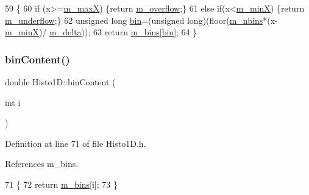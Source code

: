 \begin{DoxyCode}
59                            \{
60     \textcolor{keywordflow}{if} (x>=\hyperlink{classHisto1D_a6a5007569e096537f9b7b39d2aad865b}{m\_maxX}) \{\textcolor{keywordflow}{return} \hyperlink{classHisto1D_ab60b2ec4e435a3094b7ec218404aa16f}{m\_overflow};\}
61     \textcolor{keywordflow}{else} \textcolor{keywordflow}{if}(x<\hyperlink{classHisto1D_af5ce58b20e96fa6e4b306109dd88589e}{m\_minX}) \{\textcolor{keywordflow}{return} \hyperlink{classHisto1D_a7f475b822f4bbb23209e2e523d228380}{m\_underflow};\}
62     \textcolor{keywordtype}{unsigned} \textcolor{keywordtype}{long} \hyperlink{classHisto1D_a2a8a7d93c2f10b73b490a6f550e00db4}{bin}=(\textcolor{keywordtype}{unsigned} long)(floor(\hyperlink{classHisto1D_a1913aca9a278b4bfd365f35b85e65d8d}{m\_nbins}*(x-\hyperlink{classHisto1D_af5ce58b20e96fa6e4b306109dd88589e}{m\_minX})/
      \hyperlink{classHisto1D_a993e2e40b89e257e6f86c0742f6f06b3}{m\_delta}));
63     \textcolor{keywordflow}{return} \hyperlink{classHisto1D_a7a82923d3938739904469f5aa0a517ca}{m\_bins}[\hyperlink{classHisto1D_a2a8a7d93c2f10b73b490a6f550e00db4}{bin}];
64 \}   
\end{DoxyCode}
\mbox{\label{classHisto1D_aece5cb8dddafabe0029067dc3e4be878}} 
\subsubsection{\texorpdfstring{bin\+Content()}{binContent()}}
{\footnotesize\ttfamily double Histo1\+D\+::bin\+Content (\begin{DoxyParamCaption}\item[{int}]{i }\end{DoxyParamCaption})\hspace{0.3cm}{\ttfamily [inline]}}



Definition at line 71 of file Histo1\+D.\+h.



References m\+\_\+bins.


\begin{DoxyCode}
71                           \{
72     \textcolor{keywordflow}{return} \hyperlink{classHisto1D_a7a82923d3938739904469f5aa0a517ca}{m\_bins}[i];
73   \}
\end{DoxyCode}
\mbox{\label{classHisto1D_a7923d51b02056dbaef353b70c11499d0}} 
